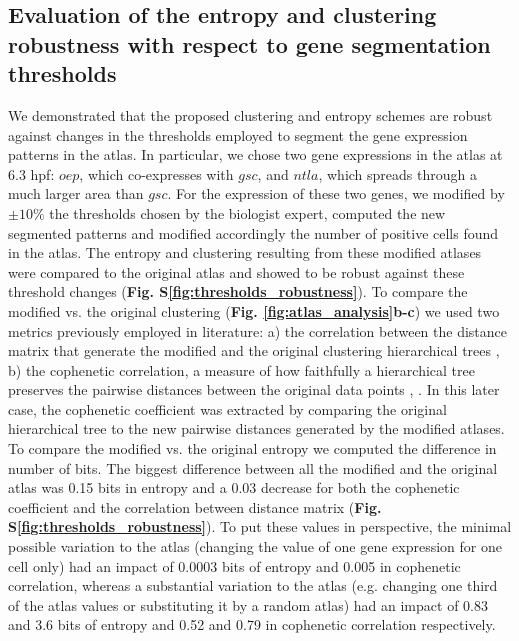 \subsection*{Evaluation of the entropy and clustering robustness with respect to gene segmentation thresholds}
\label{sec:evaluationEntropyClustering}

We demonstrated that the proposed clustering and entropy schemes are robust against changes in the thresholds employed to segment the gene expression patterns in the atlas. In particular, we chose two gene expressions in the atlas at 6.3 hpf: $oep$, which co-expresses with $gsc$, and $ntla$, which spreads through a much larger area than $gsc$. For the expression of these two genes, we modified by $\pm10\%$ the thresholds chosen by the biologist expert, computed the new segmented patterns and modified accordingly the number of positive cells found in the atlas. The entropy and clustering resulting from these modified atlases were compared to the original atlas and showed to be robust against these threshold changes (\textbf{Fig. S\ref{fig:thresholds_robustness}}).
To compare the modified vs. the original clustering (\textbf{Fig. \ref{fig:atlas_analysis}b-c}) we used two metrics previously employed in literature: a) the correlation between the distance matrix that generate the modified and the original clustering hierarchical trees \cite{duncan1980comparison}, b) the cophenetic correlation, a measure of how faithfully a hierarchical tree preserves the pairwise distances between the original data points \cite{sokal1962the}, \cite{saracli2013comparison}. In this later case, the cophenetic coefficient was extracted by comparing the original hierarchical tree to the new pairwise distances generated by the modified atlases. To compare the modified vs. the original entropy we computed the difference in number of bits.
The biggest difference between all the modified and the original atlas was 0.15 bits in entropy and a 0.03 decrease for both the cophenetic coefficient and the correlation between distance matrix (\textbf{Fig. S\ref{fig:thresholds_robustness}}). To put these values in perspective, the minimal possible variation to the atlas (changing the value of one gene expression for one cell only) had an impact of 0.0003 bits of entropy and 0.005 in cophenetic correlation, whereas a substantial variation to the atlas (e.g. changing one third of the atlas values or substituting it by a random atlas) had an impact of 0.83 and 3.6 bits of entropy and 0.52 and 0.79 in cophenetic correlation respectively.

